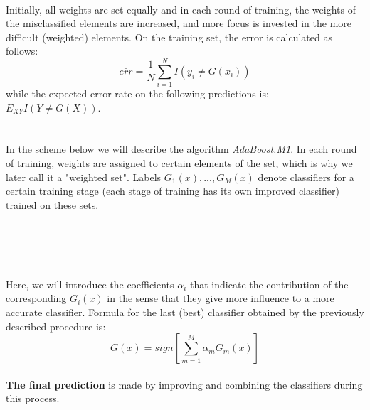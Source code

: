 \documentclass[12pt, letterpaper, twoside]{article}
\begin{document}
\\\hspace*{4ex}Initially, all weights are set equally and in each round of training, the weights of the misclassified elements are increased, and more focus is invested in the more difficult (weighted) elements.
On the training set, the error is calculated as follows:\begin{equation}
\bar{err}=\frac{1}{N}\sum_{i=1}^{N}I(y_i\neq G(x_i))
\end{equation}
while the expected error rate on the following predictions is:\\
$E_{XY}I(Y\neq G(X))$.
\\
\\
\\\hspace*{4ex}In the scheme below we will describe the algorithm \emph{AdaBoost.M1}. In each round of training, weights are assigned to certain elements of the set, which is why we later call it a "weighted set".
Labels $G_1(x),...,G_M(x)$ denote classifiers for a certain training stage (each stage of training has its own improved classifier) trained on these sets.
\\
\\
\\
\\
\\
Here, we will introduce the coefficients $\alpha_i$ that indicate the contribution of the corresponding $G_i(x)$ in the sense that they give more influence to a more accurate classifier. Formula for the last (best) classifier obtained by the previously described procedure is:
\begin{equation*}
G(x)=sign [\sum_{m=1}^{M}\alpha_m G_m(x)]
\end{equation*}
\\
\textbf{The final prediction} is made by improving and combining the classifiers during this process. 
\end{document}
